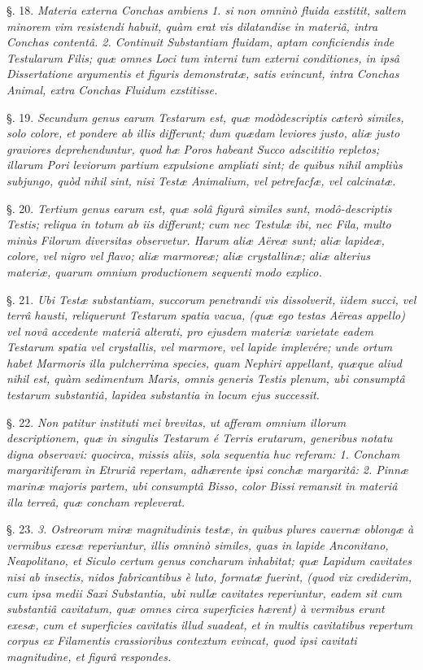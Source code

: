 \documentclass[a4paper, 11pt, oneside, polutonikogreek, german]{article}
\begin{document}
§. 18. \emph{Materia externa Conchas ambiens 1. si non omninò fluida exstitit, saltem minorem vim resistendi habuit, quàm erat vis dilatandise in materiâ, intra Conchas contentâ. 2. Continuit Substantiam fluidam, aptam conficiendis inde Testularum Filis; quæ omnes Loci tum interni tum externi conditiones, in ipsâ Dissertatione argumentis et figuris demonstratæ, satis evincunt, intra Conchas Animal, extra Conchas Fluidum exstitisse.}

§. 19. \emph{Secundum genus earum Testarum est, quæ modòdescriptis cæterò similes, solo colore, et pondere ab illis differunt; dum quædam leviores justo, aliæ justo graviores deprehenduntur, quod hæ Poros habeant Succo adscititio repletos; illarum Pori leviorum partium expulsione ampliati sint; de quibus nihil ampliùs subjungo, quòd nihil sint, nisi Testæ Animalium, vel petrefacfæ, vel calcinatæ.}

§. 20. \emph{Tertium genus earum est, quæ solâ figurâ similes sunt, modô-descriptis Testis; reliqua in totum ab iis differunt; cum nec Testulæ ibi, nec Fila, multo minùs Filorum diversitas observetur. Harum aliæ Aëreæ sunt; aliæ lapideæ, colore, vel nigro vel flavo; aliæ marmoreæ; aliæ crystallinæ; aliæ alterius materiæ, quarum omnium productionem sequenti modo explico.}

§. 21. \emph{Ubi Testæ substantiam, succorum penetrandi vis dissolverit, iidem succi, vel terrâ hausti, reliquerunt Testarum spatia vacua, (quæ ego testas Aëreas appello) vel novâ accedente materiâ alterati, pro ejusdem materiæ varietate eadem Testarum spatia vel crystallis, vel marmore, vel lapide implevére; unde ortum habet Marmoris illa pulcherrima species, quam Nephiri appellant, quæque aliud nihil est, quàm sedimentum Maris, omnis generis Testis plenum, ubi consumptâ testarum substantiâ, lapidea substantia in locum ejus successit.}

§. 22. \emph{Non patitur instituti mei brevitas, ut afferam omnium illorum descriptionem, quæ in singulis Testarum é Terris erutarum, generibus notatu digna observavi: quocirca, missis aliis, sola sequentia huc referam: 1. Concham margaritiferam in Etruriâ repertam, adhærente ipsi conchæ margaritâ: 2. Pinnæ marinæ majoris partem, ubi consumptâ Bisso, color Bissi remansit in materiâ illa terreâ, quæ concham repleverat.}

§. 23. \emph{3. Ostreorum miræ magnitudinis testæ, in quibus plures cavernæ oblongæ à vermibus exesæ reperiuntur, illis omninò similes, quas in lapide Anconitano, Neapolitano, et Siculo certum genus concharum inhabitat; quæ Lapidum cavitates nisi ab insectis, nidos fabricantibus è luto, formatæ fuerint, (quod vix crediderim, cum ipsa medii Saxi Substantia, ubi nullæ cavitates reperiuntur, eadem sit cum substantiâ cavitatum, quæ omnes circa superficies hærent) à vermibus erunt exesæ, cum et superficies cavitatis illud suadeat, et in multis cavitatibus repertum corpus ex Filamentis crassioribus contextum evincat, quod ipsi cavitati magnitudine, et figurâ respondes.}
\end{document}
